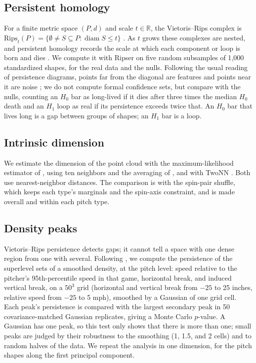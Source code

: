 \documentclass{article}
\newcommand{\R}{\mathbb{R}}
\DeclareMathOperator{\diam}{diam}
\theoremstyle{definition}
\theoremstyle{remark}
\begin{document}
\subsection{Persistent homology}
For a finite metric space $(P, d)$ and scale $t \in \R$, the Vietoris--Rips complex is $\mathrm{Rips}_t(P) = \{ \emptyset \neq S \subseteq P : \diam S \le t \}$ \parencite{bauer2021ripser}.
As $t$ grows these complexes are nested, and persistent homology records the scale at which each component or loop is born and dies \parencite{edelsbrunnerletscherzomorodian2002,zomorodiancarlsson2005}.
We compute it with Ripser \parencite{bauer2021ripser,tralie2018ripserpy} on five random subsamples of 1{,}000 standardized shapes, for the real data and the nulls.
Following the usual reading of persistence diagrams, points far from the diagonal are features and points near it are noise \parencite{fasy2014confidence}; we do not compute formal confidence sets, but compare with the nulls, counting an $H_0$ bar as long-lived if it dies after three times the median $H_0$ death and an $H_1$ loop as real if its persistence exceeds twice that.
An $H_0$ bar that lives long is a gap between groups of shapes; an $H_1$ bar is a loop.

\subsection{Intrinsic dimension}
We estimate the dimension of the point cloud with the maximum-likelihood estimator of \textcite{levinabickel2004}, using ten neighbors and the averaging of \textcite{mackay2005comments}, and with TwoNN \parencite{facco2017twonn}.
Both use nearest-neighbor distances. The comparison is with the spin-pair shuffle, which keeps each type's marginals and the spin-axis constraint, and is made overall and within each pitch type.

\subsection{Density peaks}
Vietoris--Rips persistence detects gaps; it cannot tell a space with one dense region from one with several.
Following \textcite{maloof2026classify}, we compute the persistence of the superlevel sets of a smoothed density, at the pitch level: speed relative to the pitcher's 95th-percentile speed in that game, horizontal break, and induced vertical break, on a $50^3$ grid (horizontal and vertical break from $-25$ to 25 inches, relative speed from $-25$ to 5 mph), smoothed by a Gaussian of one grid cell.
Each peak's persistence is compared with the largest secondary peak in 50 covariance-matched Gaussian replicates, giving a Monte Carlo $p$-value.
A Gaussian has one peak, so this test only shows that there is more than one; small peaks are judged by their robustness to the smoothing (1, 1.5, and 2 cells) and to random halves of the data.
We repeat the analysis in one dimension, for the pitch shapes along the first principal component.
\end{document}
